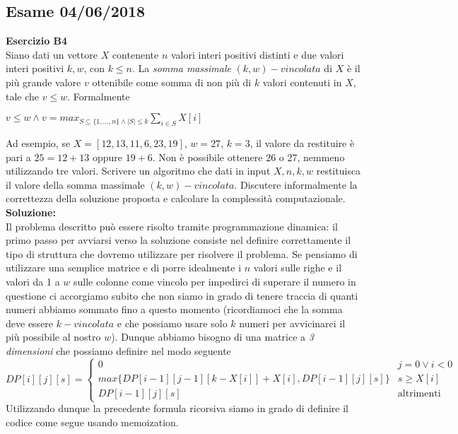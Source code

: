 \documentclass[../cheatSheetAlgoritmi.tex]{subfiles}
\begin{document}
\subsection{Esame 04/06/2018}
\textbf{Esercizio B4}\\
Siano dati un vettore $X$ contenente $n$ valori interi positivi distinti e due valori interi positivi $k, w$, con $k \leq n$. La \emph{somma massimale} $(k, w)-vincolata$ di $X$ è il più grande valore $v$ ottenibile come somma di non più di $k$ valori contenuti in $X$, tale che $v \leq w$. Formalmente
\begin{center}
	$v \leq w \land v = max_{S \subseteq \{1, ..., n\} \land \mid S \mid \leq k} \sum_{i \in S} X[i]$\\
\end{center}
Ad esempio, se $X = [12,13,11,6,23,19]$, $w = 27$, $k= 3$, il valore da restituire è pari a $25 = 12 + 13$ oppure $19 + 6$. Non è possibile ottenere 26 o 27, nemmeno utilizzando tre valori. Scrivere un algoritmo che dati in input $X,n,k,w$ restituisca il valore della somma massimale $(k, w)-vincolata$. Discutere informalmente la correttezza della   soluzione proposta e calcolare la complessità computazionale.\\
\textbf{Soluzione:}\\
Il problema descritto può essere risolto tramite programmazione dinamica: il primo passo per avviarsi verso la soluzione consiste nel definire correttamente il tipo di struttura che dovremo utilizzare per risolvere il problema. Se pensiamo di utilizzare una semplice matrice e di porre idealmente i $n$ valori sulle righe e il valori da 1 a $w$ sulle colonne come vincolo per impedirci di superare il numero in questione ci accorgiamo subito che non siamo in grado di tenere traccia di quanti numeri abbiamo sommato fino a questo momento (ricordiamoci che la somma deve essere $k-vincolata$ e che possiamo usare solo $k$ numeri per avvicinarci il più possibile al nostro $w$). Dunque abbiamo bisogno di una matrice a \emph{3 dimensioni} che possiamo definire nel modo seguente
\begin{equation*}
  	DP[i][j][s]=\begin{cases}
  		0 & \text{$j = 0 \lor i < 0$}\\
  		max\{DP[i-1][j-1][k - X[i]] + X[i], DP[i-1][j][s]\} &\text{$s \geq X[i]$}\\
    	DP[i-1][j][s] & \text{altrimenti}
  	\end{cases}
\end{equation*}
Utilizzando dunque la precedente formula ricorsiva siamo in grado di definire il codice come segue usando memoization.
\end{document}
